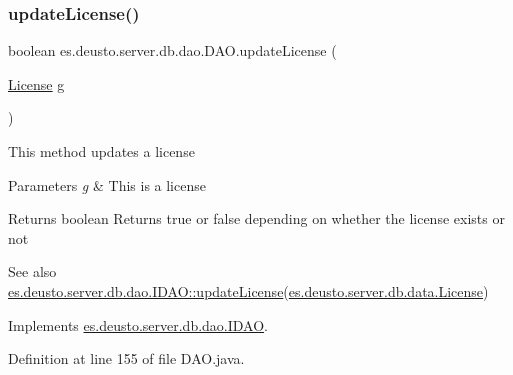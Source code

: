 \mbox{\label{classes_1_1deusto_1_1server_1_1db_1_1dao_1_1_d_a_o_a98774e8d93cdd4d8d104a197bd37d4e1}} 
\subsubsection{\texorpdfstring{update\+License()}{updateLicense()}}
{\footnotesize\ttfamily boolean es.\+deusto.\+server.\+db.\+dao.\+D\+A\+O.\+update\+License (\begin{DoxyParamCaption}\item[{\hyperlink{classes_1_1deusto_1_1server_1_1db_1_1data_1_1_license}{License}}]{g }\end{DoxyParamCaption})}

This method updates a license 
\begin{DoxyParams}{Parameters}
{\em g} & This is a license \\
\hline
\end{DoxyParams}
\begin{DoxyReturn}{Returns}
boolean Returns true or false depending on whether the license exists or not 
\end{DoxyReturn}
\begin{DoxySeeAlso}{See also}
\hyperlink{interfacees_1_1deusto_1_1server_1_1db_1_1dao_1_1_i_d_a_o_a601329b95123948b10c3232687b11d5b}{es.\+deusto.\+server.\+db.\+dao.\+I\+D\+A\+O\+::update\+License}(\hyperlink{classes_1_1deusto_1_1server_1_1db_1_1data_1_1_license}{es.\+deusto.\+server.\+db.\+data.\+License}) 
\end{DoxySeeAlso}


Implements \hyperlink{interfacees_1_1deusto_1_1server_1_1db_1_1dao_1_1_i_d_a_o_a601329b95123948b10c3232687b11d5b}{es.\+deusto.\+server.\+db.\+dao.\+I\+D\+AO}.



Definition at line 155 of file D\+A\+O.\+java.

\mbox{\label{classes_1_1deusto_1_1server_1_1db_1_1dao_1_1_d_a_o_a7f6ed77294fe1f61cbebbea410cef6e0}} 
